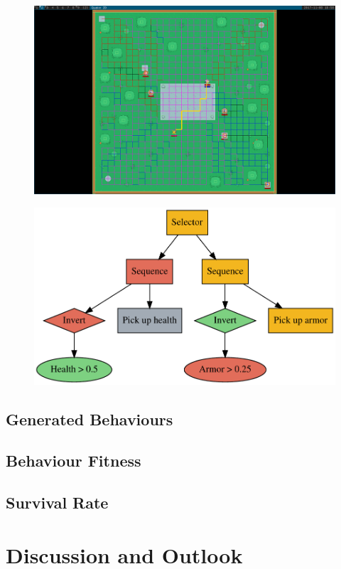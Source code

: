 \documentclass[a4paper, twocolumn]{article}
\begin{document}
        \begin{figure}[H]
            \centering
            \includegraphics[width=\linewidth]{share/path_finding_screenshot.png}
            \label{fig:path_finding_screenshot}
        \end{figure}

        \begin{figure}[H]
            \centering
            \includegraphics[width=\linewidth]{share/behaviour_tree.pdf}
            \label{fig:hand_crafted_behaviour_tree}
        \end{figure}

        \subsection{Generated Behaviours} \label{sec:generated_behaviours}



        \subsection{Behaviour Fitness} \label{sec:behaviour_fitness}



        \subsection{Survival Rate} \label{sec:survival_rate}



    \section{Discussion and Outlook} \label{sec:discussion_and_outlook}
\end{document}
